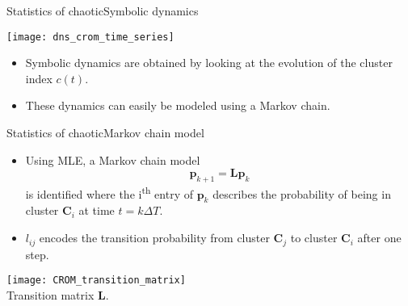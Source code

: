 \begin{frame}[t, c]{Statistics of chaotic}{Symbolic dynamics}
  \begin{minipage}{.48\textwidth}
    \centering
    \texttt{[image: dns\_crom\_time\_series]}
  \end{minipage}%
  \hfill
  \begin{minipage}{.48\textwidth}
    \begin{itemize}
    \item Symbolic dynamics are obtained by looking at the evolution of the cluster index \( c(t) \).
      
      \medskip
      
    \item These dynamics can easily be modeled using a Markov chain.
      
    \end{itemize}
  \end{minipage}
  
  \vspace{1cm}
\end{frame}

\begin{frame}[t, c]{Statistics of chaotic}{Markov chain model}
  \begin{minipage}{.68\textwidth}
    \begin{itemize}
    \item Using MLE, a Markov chain model
      \[
        \bm{p}_{k+1} = \bm{Lp}_k
      \]
      is identified where the i\textsuperscript{th} entry of \( \bm{p}_k \) describes the probability of being in cluster \( \bm{C}_i \) at time \( t = k \Delta T \).
      
      \medskip
      
    \item \( l_{ij} \) encodes the transition probability from cluster \( \bm{C}_j \) to cluster \( \bm{C}_i \) after one step.

    \end{itemize}
  \end{minipage}%
  \hfill
  \begin{minipage}{.28\textwidth}
    \centering
    \texttt{[image: CROM\_transition\_matrix]} \\
    
    {\small
      Transition matrix \( \bm{L} \).
    }
  \end{minipage}
  
  \vspace{1cm}
\end{frame}

